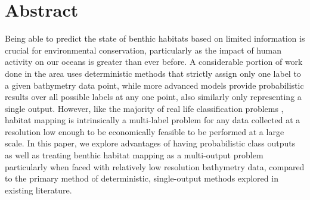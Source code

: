 \chapter*{Abstract}

Being able to predict the state of benthic habitats based on limited information is crucial for environmental conservation, particularly as the impact of human activity on our oceans is greater than ever before. A considerable portion of work done in the area uses deterministic methods that strictly assign only one label to a given bathymetry data point, while more advanced models provide probabilistic results over all possible labels at any one point, also similarly only representing a single output. However, like the majority of real life classification problems , habitat mapping is intrinsically a multi-label problem for any data collected at a resolution low enough to be economically feasible to be performed at a large scale. In this paper, we explore advantages of having probabilistic class outputs as well as treating benthic habitat mapping as a multi-output problem particularly when faced with relatively low resolution bathymetry data, compared to the primary method of deterministic, single-output methods explored in existing literature.
